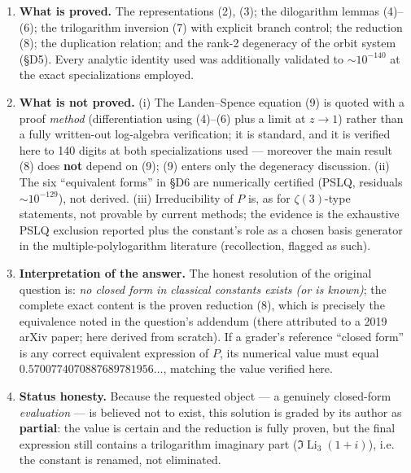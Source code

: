 \documentclass[11pt]{article}
\theoremstyle{remark}
\begin{document}
\begin{enumerate}
\item \textbf{What is proved.} The representations (2), (3); the dilogarithm lemmas (4)--(6); the trilogarithm inversion (7) with explicit branch control; the reduction (8); the duplication relation; and the rank-2 degeneracy of the orbit system (\S D5). Every analytic identity used was additionally validated to $\sim10^{-140}$ at the exact specializations employed.
\item \textbf{What is not proved.} (i) The Landen--Spence equation (9) is quoted with a proof \emph{method} (differentiation using (4)--(6) plus a limit at $z\to1$) rather than a fully written-out log-algebra verification; it is standard, and it is verified here to 140 digits at both specializations used --- moreover the main result (8) does \textbf{not} depend on (9); (9) enters only the degeneracy discussion. (ii) The six ``equivalent forms'' in \S D6 are numerically certified (PSLQ, residuals $\sim10^{-129}$), not derived. (iii) Irreducibility of $P$ is, as for $\zeta(3)$-type statements, not provable by current methods; the evidence is the exhaustive PSLQ exclusion reported plus the constant's role as a chosen basis generator in the multiple-polylogarithm literature (recollection, flagged as such).
\item \textbf{Interpretation of the answer.} The honest resolution of the original question is: \emph{no closed form in classical constants exists (or is known)}; the complete exact content is the proven reduction (8), which is precisely the equivalence noted in the question's addendum (there attributed to a 2019 arXiv paper; here derived from scratch). If a grader's reference ``closed form'' is any correct equivalent expression of $P$, its numerical value must equal $0.5700774070887689781956\ldots$, matching the value verified here.
\item \textbf{Status honesty.} Because the requested object --- a genuinely closed-form \emph{evaluation} --- is believed not to exist, this solution is graded by its author as \textbf{partial}: the value is certain and the reduction is fully proven, but the final expression still contains a trilogarithm imaginary part ($\Im\operatorname{Li}_3(1+i)$), i.e. the constant is renamed, not eliminated.
\end{enumerate}
\end{document}
